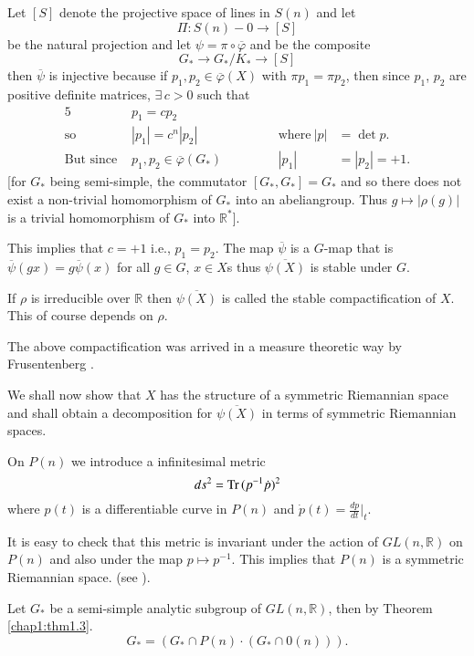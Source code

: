 Let $[S]$ denote the projective space of lines in $S(n)$ and let 
$$
\Pi : S(n) - 0 \to [S]
$$
be the natural projection and let $\psi = \pi \circ
\overline{\varphi}$ and be the composite
$$
G_* \to G_*/ K_* \to [S]
$$
then $\overline{\psi}$ is injective because if $p_1, p_2
\in \overline{\varphi} (X)$ with $\pi p_1 = \pi p_2$, then
since $p_1$, $p_2$ are positive definite matrices, $\exists\, c > 0$
such that 
\begin{alignat*}{5}
   & p_1 = cp_2 &\qquad &&&\\
  \text{so } & |p_1|= c^n |p_2| &&& \text{where}~ |p| & = \det p.\\
  \text{But since }  & p_1, p_2 \in
  \overline{\varphi} (G_*) &&&|p_1| &   = |p_2| = + 1. 
\end{alignat*}
[for $G_*$ being semi-simple, the commutator $[G_*, G_*]= G_*$ and so
  there does not exist a non-trivial homomorphism of $G_*$ into an
  abelian\pageoriginale group. Thus $g \mapsto |\rho (g)|$ is a trivial homomorphism
of $G_*$ into $\mathbb{R}^*$].

This implies that $c= +1$ i.e., $p_1=p_2$. The map
$\overline{\psi}$ is a $G$-map that is $\overline{\psi} (gx)=
g \overline{\psi} (x)$ for all $g \in G$, $x \in X$s
thus $\overline{\psi (X)}$ is stable under $G$.

\begin{defi*}
  If $\rho$ is irreducible over $\mathbb{R}$ then $\overline{\psi
    (X)}$ is called the stable compactification of $X$. This of course
  depends on $\rho$.
\end{defi*}

\begin{remark*}
  The above compactification was arrived in a measure theoretic way by
  Frusentenberg \cite{7}.
\end{remark*}

We shall now show that $X$ has the structure of a symmetric Riemannian
space and shall obtain a decomposition for $\overline{\psi (X)}$ in
terms of symmetric Riemannian spaces.

On $P(n)$ we introduce a infinitesimal metric
$$
ds^2 = \operatorname{Tr\,} (p^{-1} \dot{p})^2
$$
where $p(t)$ is a differentiable curve in $P(n)$ and $\dot{p}(t)=
\frac{dp}{dt}\Big|_t$.

It is easy to check that this metric is invariant under the action of
$GL(n, \mathbb{R})$ on $P(n)$ and also under the map $p \mapsto
p^{-1}$. This implies that $P(n)$ is a symmetric Riemannian
space. (see \cite{14}).

Let $G_*$ be a semi-simple analytic subgroup of $GL (n, \mathbb{R})$,
then by Theorem \ref{chap1:thm1.3}. 
$$
G_* = (G_* \cap P(n) \cdot (G_* \cap 0 (n))).
$$

